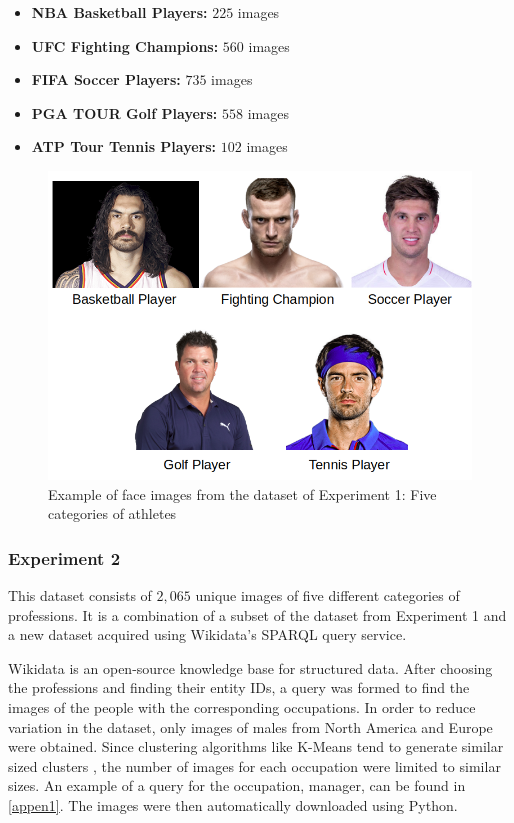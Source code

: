 \documentclass[12pt,english]{article}
\begin{document}
\begin{itemize}
\item \textbf{NBA Basketball Players: } $225$ images
\item \textbf{UFC Fighting Champions: } $560$ images
\item \textbf{FIFA Soccer Players: } $735$ images
\item \textbf{PGA TOUR Golf Players: } $558$ images
\item \textbf{ATP Tour Tennis Players: } $102$ images
\end{itemize}


\begin{figure}[!tbp]
 \centering
    \includegraphics[width=0.7\columnwidth]{figures/ex1.png}
    \caption{Example of face images from the dataset of Experiment 1: Five categories of athletes \cite{data1}}
	\label{fig:sport}
\end{figure}

\subsubsection{Experiment 2}
\label{experiment2}
\quad
This dataset consists of $2,065$ unique images of five different categories of professions. It is a combination of a subset of the dataset from Experiment 1 and a new dataset acquired using Wikidata's SPARQL query service. 

Wikidata is an open-source knowledge base for structured data. After choosing the professions and finding their entity IDs, a query was formed to find the images of the people with the corresponding occupations. In order to reduce variation in the dataset, only images of males from North America and Europe were obtained. Since clustering algorithms like K-Means tend to generate similar sized clusters \cite{shi}, the number of images for each occupation were limited to similar sizes. An example of a query for the occupation, manager, can be found in \ref{appen1}. The images were then automatically downloaded using Python. 
\end{document}
